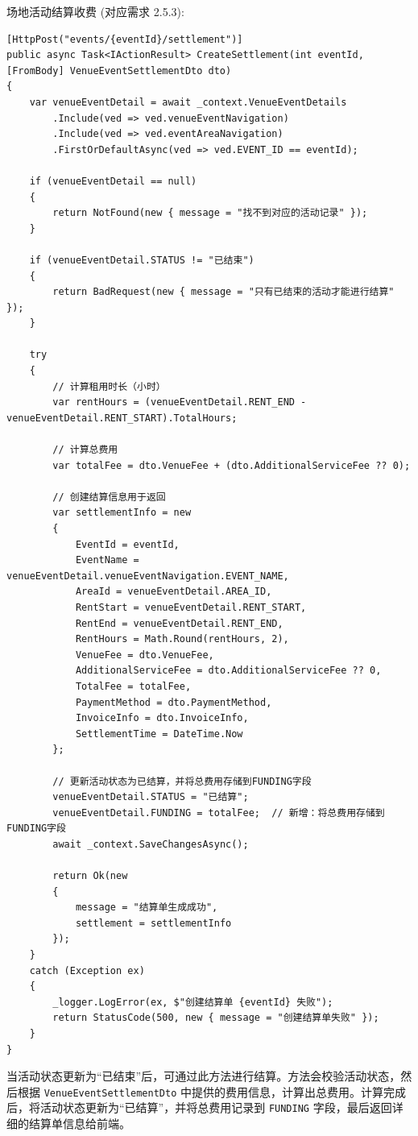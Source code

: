 \documentclass[]{article}
\begin{document}
场地活动结算收费 (对应需求 2.5.3):
\begin{verbatim}
[HttpPost("events/{eventId}/settlement")]
public async Task<IActionResult> CreateSettlement(int eventId, [FromBody] VenueEventSettlementDto dto)
{
    var venueEventDetail = await _context.VenueEventDetails
        .Include(ved => ved.venueEventNavigation)
        .Include(ved => ved.eventAreaNavigation)
        .FirstOrDefaultAsync(ved => ved.EVENT_ID == eventId);

    if (venueEventDetail == null)
    {
        return NotFound(new { message = "找不到对应的活动记录" });
    }

    if (venueEventDetail.STATUS != "已结束")
    {
        return BadRequest(new { message = "只有已结束的活动才能进行结算" });
    }

    try
    {
        // 计算租用时长（小时）
        var rentHours = (venueEventDetail.RENT_END - venueEventDetail.RENT_START).TotalHours;
        
        // 计算总费用
        var totalFee = dto.VenueFee + (dto.AdditionalServiceFee ?? 0);

        // 创建结算信息用于返回
        var settlementInfo = new
        {
            EventId = eventId,
            EventName = venueEventDetail.venueEventNavigation.EVENT_NAME,
            AreaId = venueEventDetail.AREA_ID,
            RentStart = venueEventDetail.RENT_START,
            RentEnd = venueEventDetail.RENT_END,
            RentHours = Math.Round(rentHours, 2),
            VenueFee = dto.VenueFee,
            AdditionalServiceFee = dto.AdditionalServiceFee ?? 0,
            TotalFee = totalFee,
            PaymentMethod = dto.PaymentMethod,
            InvoiceInfo = dto.InvoiceInfo,
            SettlementTime = DateTime.Now
        };

        // 更新活动状态为已结算，并将总费用存储到FUNDING字段
        venueEventDetail.STATUS = "已结算";
        venueEventDetail.FUNDING = totalFee;  // 新增：将总费用存储到FUNDING字段
        await _context.SaveChangesAsync();

        return Ok(new 
        { 
            message = "结算单生成成功",
            settlement = settlementInfo
        });
    }
    catch (Exception ex)
    {
        _logger.LogError(ex, $"创建结算单 {eventId} 失败");
        return StatusCode(500, new { message = "创建结算单失败" });
    }
}
\end{verbatim}
当活动状态更新为“已结束”后，可通过此方法进行结算。方法会校验活动状态，然后根据 \texttt{VenueEventSettlementDto} 中提供的费用信息，计算出总费用。计算完成后，将活动状态更新为“已结算”，并将总费用记录到 \texttt{FUNDING} 字段，最后返回详细的结算单信息给前端。
\end{document}
